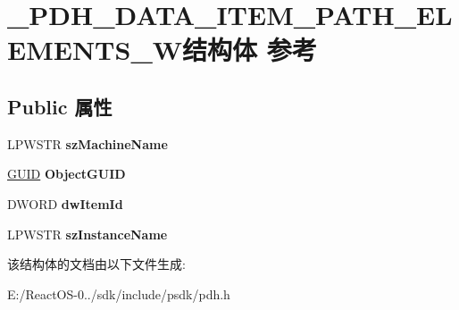 \hypertarget{struct___p_d_h___d_a_t_a___i_t_e_m___p_a_t_h___e_l_e_m_e_n_t_s___w}{}\section{\+\_\+\+P\+D\+H\+\_\+\+D\+A\+T\+A\+\_\+\+I\+T\+E\+M\+\_\+\+P\+A\+T\+H\+\_\+\+E\+L\+E\+M\+E\+N\+T\+S\+\_\+\+W结构体 参考}
\label{struct___p_d_h___d_a_t_a___i_t_e_m___p_a_t_h___e_l_e_m_e_n_t_s___w}
\subsection*{Public 属性}
\begin{DoxyCompactItemize}
\item 
\mbox{\label{struct___p_d_h___d_a_t_a___i_t_e_m___p_a_t_h___e_l_e_m_e_n_t_s___w_aeef864dde23374d88a388a7eaad89aa8}} 
L\+P\+W\+S\+TR {\bfseries sz\+Machine\+Name}
\item 
\mbox{\label{struct___p_d_h___d_a_t_a___i_t_e_m___p_a_t_h___e_l_e_m_e_n_t_s___w_a67ca0d8e4007a97dc86167bca14a77e5}} 
\hyperlink{interface_g_u_i_d}{G\+U\+ID} {\bfseries Object\+G\+U\+ID}
\item 
\mbox{\label{struct___p_d_h___d_a_t_a___i_t_e_m___p_a_t_h___e_l_e_m_e_n_t_s___w_a276dde3b7d695d240844672132debff1}} 
D\+W\+O\+RD {\bfseries dw\+Item\+Id}
\item 
\mbox{\label{struct___p_d_h___d_a_t_a___i_t_e_m___p_a_t_h___e_l_e_m_e_n_t_s___w_a2b8d3492de013344adfcc322440b222d}} 
L\+P\+W\+S\+TR {\bfseries sz\+Instance\+Name}
\end{DoxyCompactItemize}


该结构体的文档由以下文件生成\+:\begin{DoxyCompactItemize}
\item 
E\+:/\+React\+O\+S-\/0../sdk/include/psdk/pdh.\+h\end{DoxyCompactItemize}
